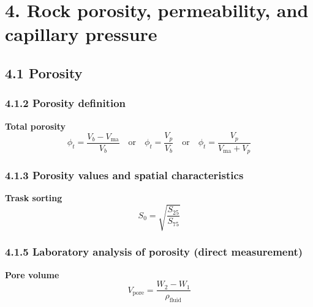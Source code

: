 \section{4. Rock porosity, permeability, and capillary pressure}
\subsection{4.1 Porosity}
\subsubsection{4.1.2 Porosity definition}
\textbf{Total porosity}
\begin{equation*}
    \phi_t = \frac{V_b - V_\mathrm{ma}}{V_b}\quad\text{or}\quad\phi_t = \frac{V_p}{V_b}\quad\text{or}\quad\phi_t = \frac{V_p}{V_\mathrm{ma} + V_p}\tag{4.1, 4.2, 4.3}
\end{equation*}

\subsubsection{4.1.3 Porosity values and spatial characteristics}
\textbf{Trask sorting}
\begin{equation*}
    S_0 = \sqrt{\frac{S_{25}}{S_{75}}}\tag{4.4}
\end{equation*}

\subsubsection{4.1.5 Laboratory analysis of porosity (direct measurement)}
\textbf{Pore volume}
\begin{equation*}
    V_\mathrm{pore} = \frac{W_2 - W_1}{\rho_\mathrm{fluid}}\tag{4.5}
\end{equation*}

